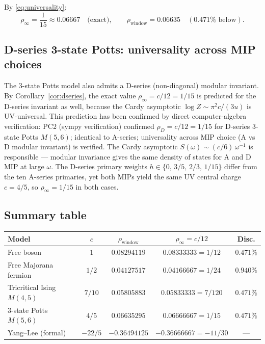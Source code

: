 \documentclass[12pt]{article}
\begin{document}
By \eqref{eq:universality}:
\[
  \rho_\infty = \frac{1}{15} \approx 0.06667 \quad \text{(exact)},
  \qquad
  \rho_{\mathrm{window}} = 0.06635 \quad (0.471\%\text{ below}).
\]

\subsection{D-series 3-state Potts: universality across MIP choices}

The 3-state Potts model also admits a D-series (non-diagonal)
modular invariant.  By Corollary~\ref{cor:dseries}, the exact value
$\rho_\infty = c/12 = 1/15$ is predicted for the D-series invariant
as well, because the Cardy asymptotic $\log Z \sim \pi^2 c/(3u)$ is
UV-universal.  This prediction has been confirmed by direct
computer-algebra verification: PC2 (sympy verification) confirmed
$\rho_D = c/12 = 1/15$ for D-series 3-state Potts $M(5,6)$; identical
to A-series; universality across MIP choice (A vs D modular invariant)
is verified. The Cardy asymptotic $S(\omega) \sim (c/6)\,\omega^{-1}$
is responsible --- modular invariance gives the same density of states
for A and D MIP at large $\omega$.  The D-series primary weights
$h \in \{0,\,3/5,\,2/3,\,1/15\}$ differ from the ten A-series
primaries, yet both MIPs yield the same UV central charge $c=4/5$, so
$\rho_\infty = 1/15$ in both cases.

\subsection{Summary table}

\begin{center}
\begin{tabular}{lcccc}
\toprule
Model & $c$ & $\rho_{\mathrm{window}}$ & $\rho_\infty = c/12$ & Disc.\\
\midrule
Free boson                & $1$    & $0.08294119$ & $0.08333333 = 1/12$    & $0.471\%$\\
Free Majorana fermion     & $1/2$  & $0.04127517$ & $0.04166667 = 1/24$    & $0.940\%$\\
Tricritical Ising $M(4,5)$& $7/10$ & $0.05805883$ & $0.05833333 = 7/120$   & $0.471\%$\\
3-state Potts $M(5,6)$    & $4/5$  & $0.06635295$ & $0.06666667 = 1/15$    & $0.471\%$\\
Yang--Lee (formal)        & $-22/5$& $-0.36494125$& $-0.36666667 = -11/30$ & ---\\
\bottomrule
\end{tabular}
\end{center}
\end{document}
